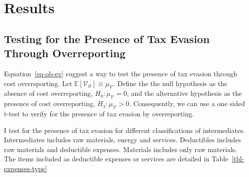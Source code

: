 \documentclass[
  12pt]{article}
\theoremstyle{definition}
\theoremstyle{remark}
\begin{document}
\begin{table}
{}

\end{table}%

\section{Results}\label{results-1}

\subsection{Testing for the Presence of Tax Evasion Through
Overreporting}\label{testing-for-the-presence-of-tax-evasion-through-overreporting}

Equation~\ref{eq-ob-ev} suggest a way to test the presence of tax
evasion through cost overreporting. Let
\(\mathbb{E}[\mathcal{V}_{it}]\equiv \mu_{\mathcal{V}}\). Define the the
null hypothesis as the absence of cost overreporting,
\(H_0: \mu_{\mathcal{V}}=0\), and the alternative hypothesis as the
presence of cost overreporting, \(H_1: \mu_{\mathcal{V}}>0\).
Consequently, we can use a one sided t-test to verify for the presence
of tax evasion by overreporting.

I test for the presence of tax evasion for different classifications of
intermediates. Intermediates includes raw materials, energy and
services. Deductibles includes raw materials and deductible expenses.
Materials includes only raw materials. The items included as deductible
expenses or services are detailed in Table~\ref{tbl-expenses-type}
\end{document}
